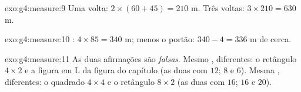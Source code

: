 \begin{solution}{exo:g4:measure:9}
Uma volta: $2 \times (60 + 45) = 210$ m. Três voltas:
$3 \times 210 = 630$ m.
\end{solution}

\begin{solution}{exo:g4:measure:10}
: $4 \times 85 = 340$ m; menos o portão:
$340 - 4 = 336$ m de cerca.
\end{solution}

\begin{solution}{exo:g4:measure:11}
As duas afirmações são \emph{falsas}. Mesmo , 
diferentes: o retângulo $4 \times 2$ e a figura em L da figura do
capítulo (as duas com  $12$;  $8$ e $6$). Mesma ,
 diferentes: o quadrado $4 \times 4$ e o retângulo
$8 \times 2$ (as duas com  $16$;  $16$ e $20$).
\end{solution}
